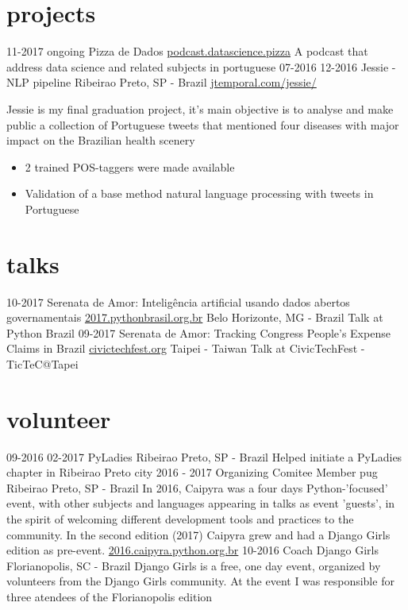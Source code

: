 \documentclass[]{friggeri-cv}
\begin{document}
\section{projects}

\begin{entrylist}
  \entry
    {11-2017 ongoing}
    {Pizza de Dados}
    {\href{http://podcast.datascience.pizza/}{podcast.datascience.pizza}}
    {A podcast that address data science and related subjects in portuguese}
  \entrysecondtype
    {07-2016 12-2016}
    {Jessie - NLP pipeline}
    {Ribeirao Preto, SP - Brazil}
    {\href{http://jtemporal.com/jessie/}{jtemporal.com/jessie/}}
    {Jessie is my final graduation project, it's main objective is to analyse and make public a collection of Portuguese tweets that mentioned four diseases with major impact on the Brazilian health scenery
      \begin{itemize}
        \item 2 trained POS-taggers were made available
        \item Validation of a base method natural language processing with tweets in Portuguese
      \end{itemize}
    }
\end{entrylist}

\section{talks}

\begin{entrylist}
  \talkentry
    {10-2017}
    {Serenata de Amor: Inteligência artificial usando dados abertos governamentais}
    {\href{http://2017.pythonbrasil.org.br/}{2017.pythonbrasil.org.br}}
    {Belo Horizonte, MG - Brazil}
    {Talk at Python Brazil}
  \talkentry
    {09-2017}
    {Serenata de Amor: Tracking Congress People's Expense Claims in Brazil}
    {\href{http://civictechfest.org/}{civictechfest.org}}
    {Taipei - Taiwan}
    {Talk at CivicTechFest - TicTeC@Tapei}
\end{entrylist}

\section{volunteer}

\begin{entrylist}
  \entry
    {09-2016 02-2017}
    {PyLadies}
    {Ribeirao Preto, SP - Brazil}
    {Helped initiate a PyLadies chapter in Ribeirao Preto city}
  \entry
    {2016 - 2017}
    {Organizing Comitee Member}
    {pug Ribeirao Preto, SP - Brazil}
    {In 2016, Caipyra was a four days Python-'focused' event, with other subjects and languages appearing in talks as event 'guests', in the spirit of welcoming different development tools and practices to the community. In the second edition (2017) Caipyra grew and had a Django Girls edition as pre-event. \footnotesize\href{2016.caipyra.python.org.br}{2016.caipyra.python.org.br}}
  \entry
    {10-2016}
    {Coach}
    {Django Girls Florianopolis, SC - Brazil}
    {Django Girls is a free, one day event, organized by volunteers  from the Django Girls community. At the event I was responsible for three atendees of the Florianopolis edition}
\end{entrylist}
\end{document}

